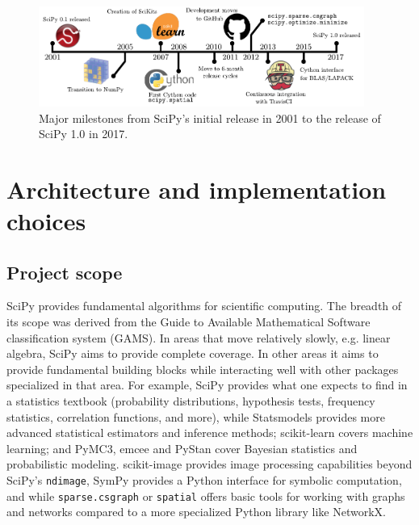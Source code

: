 \documentclass[fleqn,10pt]{wlscirep}
\begin{document}
\begin{figure}[H]
\centering
\includegraphics[width=0.95\textwidth]{static/scipy_timeline}
\caption{Major milestones from SciPy's initial release in 2001 to
the release of SciPy 1.0 in 2017.}
\label{fig:timeline}
\end{figure}




\section*{Architecture and implementation choices}
\subsection*{Project scope}

SciPy provides fundamental algorithms for scientific computing. The
breadth of its scope was derived from the Guide to Available Mathematical
Software classification system (GAMS\cite{boisvert1991guide}). In areas
that move relatively slowly, e.g. linear algebra, SciPy aims to provide
complete coverage. In other areas it aims to provide fundamental building
blocks while interacting well with other packages specialized in that area.
For example, SciPy provides what one expects to find in a
statistics textbook (probability distributions, hypothesis tests, frequency
statistics, correlation functions, and more), while 
Statsmodels\cite{statsmodels2010} provides
more advanced statistical estimators and inference methods;
scikit-learn\cite{pedregosa2011scikit} covers machine learning; and
PyMC3\cite{10.7717/peerj-cs.55}, emcee\cite{2013PASP-emcee} and 
PyStan\cite{pystan-ref} cover Bayesian statistics and probabilistic modeling.
scikit-image\cite{vanderwalt2014scikit} provides image processing
capabilities beyond SciPy's \texttt{ndimage}, SymPy\cite{meurer2017sympy}
provides a Python interface for symbolic computation, and
while \texttt{sparse.csgraph} or \texttt{spatial} offers basic tools
for working with graphs and networks compared to a more specialized
Python library like NetworkX\cite{hagberg2008networkx}.
\end{document}
